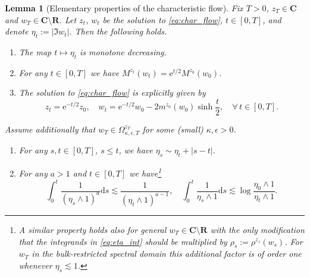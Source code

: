 \documentclass[10pt]{amsart}
\newtheorem{lemma}[theorem]{Lemma}
\numberwithin{equation}{section}
\newcommand{\dif}{\mathrm{d}}
\newcommand{\R}{\mathbf{R}}
\newcommand{\C}{\mathbf{C}}
\newcommand{\ee}{\mathrm{e}}
\begin{document}
\begin{lemma}[Elementary properties of the characteristic flow]\label{lem:char_flow}
Fix $T>0$, $z_T\in \C$ and $w_T\in \C\setminus\R$. Let $z_t$, $w_t$ be the solution to \eqref{eq:char_flow}, $t\in [0,T]$, and denote $\eta_t:=|\Im w_t|$. Then the following holds. 
\begin{enumerate}
\item The map $t\mapsto \eta_t$ is monotone decreasing.
\item For any $t\in [0,T]$ we have $M^{z_t}(w_t)=\ee^{t/2}M^{z_0}(w_0)$.
\item The solution to \eqref{eq:char_flow} is explicitly given by
\begin{equation}
z_t = \ee^{-t/2}z_0,\quad w_t = \ee^{-t/2}w_0 -2m^{z_0}(w_0)\sinh \frac{t}{2},\quad \forall\, t\in [0,T].
\label{eq:char_flow_sol}
\end{equation}
\end{enumerate}
Assume additionally that $w_T\in \Omega_{\kappa,\epsilon,T}^{z_T}$ for some (small) $\kappa, \epsilon>0$.
\begin{enumerate}
\item[(4)] For any $s,t\in [0,T]$, $s\le t$, we have $\eta_s\sim \eta_t+|s-t|$.
\item[(5)] For any $a>1$ and $t\in [0,T]$ we have\footnote{A similar property holds also for general $w_T\in \C\setminus\R$ with the only modification that the integrands in \eqref{eq:eta_int} should be multiplied by $\rho_s:=\rho^{z_s}(w_s)$. For $w_T$ in the bulk-restricted spectral domain this additional factor is of order one whenever $\eta_s\lesssim 1$.} 
\begin{equation}
\int_0^t \frac{1}{(\eta_s\wedge 1)^a}\dif s\lesssim \frac{1}{(\eta_t\wedge 1)^{a-1}},\quad \int_0^t \frac{1}{\eta_s\wedge 1}\dif s\lesssim \log \frac{\eta_0\wedge 1}{\eta_t\wedge 1}.
\label{eq:eta_int}
\end{equation}
\end{enumerate}
\end{lemma}
\end{document}
